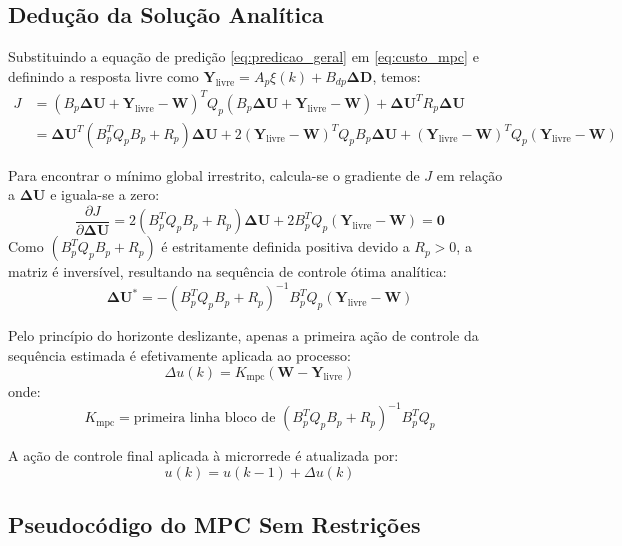 \documentclass[12pt,journal,onecolumn]{article}
\begin{document}
\subsection{Dedução da Solução Analítica}
Substituindo a equação de predição \eqref{eq:predicao_geral} em \eqref{eq:custo_mpc} e definindo a resposta livre como $\bm{Y}_{\text{livre}} = A_p \xi(k) + B_{dp} \bm{\Delta D}$, temos:
\begin{align}
J &= (B_p \bm{\Delta U} + \bm{Y}_{\text{livre}} - \bm{W})^T Q_p (B_p \bm{\Delta U} + \bm{Y}_{\text{livre}} - \bm{W}) + \bm{\Delta U}^T R_p \bm{\Delta U} \nonumber \\
  &= \bm{\Delta U}^T (B_p^T Q_p B_p + R_p) \bm{\Delta U} + 2 (\bm{Y}_{\text{livre}} - \bm{W})^T Q_p B_p \bm{\Delta U} + (\bm{Y}_{\text{livre}} - \bm{W})^T Q_p (\bm{Y}_{\text{livre}} - \bm{W})
\end{align}

Para encontrar o mínimo global irrestrito, calcula-se o gradiente de $J$ em relação a $\bm{\Delta U}$ e iguala-se a zero:
\begin{equation}
\frac{\partial J}{\partial \bm{\Delta U}} = 2(B_p^T Q_p B_p + R_p) \bm{\Delta U} + 2 B_p^T Q_p (\bm{Y}_{\text{livre}} - \bm{W}) = \bm{0}
\end{equation}
Como $(B_p^T Q_p B_p + R_p)$ é estritamente definida positiva devido a $R_p > 0$, a matriz é inversível, resultando na sequência de controle ótima analítica:
\begin{equation}
\label{eq:solucao_analitica}
\bm{\Delta U}^* = -(B_p^T Q_p B_p + R_p)^{-1} B_p^T Q_p (\bm{Y}_{\text{livre}} - \bm{W})
\end{equation}

Pelo princípio do horizonte deslizante, apenas a primeira ação de controle da sequência estimada é efetivamente aplicada ao processo:
\begin{equation}
\Delta u(k) = K_{\text{mpc}} (\bm{W} - \bm{Y}_{\text{livre}})
\end{equation}
onde:
\begin{equation}
K_{\text{mpc}} = \text{primeira linha bloco de } (B_p^T Q_p B_p + R_p)^{-1} B_p^T Q_p
\end{equation}

A ação de controle final aplicada à microrrede é atualizada por:
\begin{equation}
u(k) = u(k-1) + \Delta u(k)
\end{equation}

\subsection{Pseudocódigo do MPC Sem Restrições}
\end{document}

